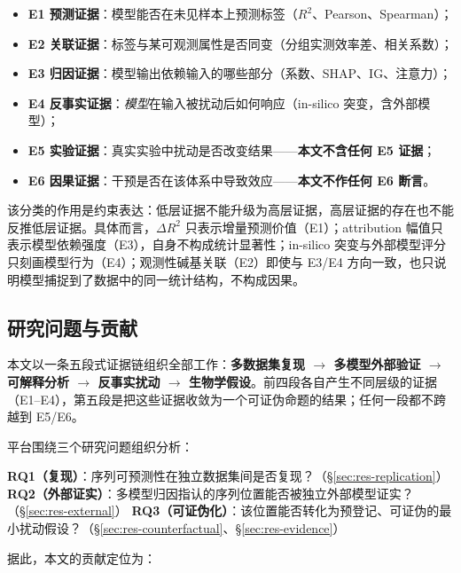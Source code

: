 \begin{itemize}
\item \textbf{E1 预测证据}：模型能否在未见样本上预测标签（$R^{2}$、Pearson、Spearman）；
\item \textbf{E2 关联证据}：标签与某可观测属性是否同变（分组实测效率差、相关系数）；
\item \textbf{E3 归因证据}：模型输出依赖输入的哪些部分（系数、SHAP、IG、注意力）；
\item \textbf{E4 反事实证据}：\emph{模型}在输入被扰动后如何响应（in-silico 突变，含外部模型）；
\item \textbf{E5 实验证据}：真实实验中扰动是否改变结果——\textbf{本文不含任何 E5 证据}；
\item \textbf{E6 因果证据}：干预是否在该体系中导致效应——\textbf{本文不作任何 E6 断言}。
\end{itemize}

该分类的作用是约束表达：低层证据不能升级为高层证据，高层证据的存在也不能反推低层证据。具体而言，$\Delta R^{2}$ 只表示增量预测价值（E1）；attribution 幅值只表示模型依赖强度（E3），自身不构成统计显著性；in-silico 突变与外部模型评分只刻画模型行为（E4）；观测性碱基关联（E2）即使与 E3/E4 方向一致，也只说明模型捕捉到了数据中的同一统计结构，不构成因果。

\subsection{研究问题与贡献}

本文以一条五段式证据链组织全部工作：\textbf{多数据集复现 $\rightarrow$ 多模型外部验证 $\rightarrow$ 可解释分析 $\rightarrow$ 反事实扰动 $\rightarrow$ 生物学假设}。前四段各自产生不同层级的证据（E1--E4），第五段是把这些证据收敛为一个可证伪命题的结果；任何一段都不跨越到 E5/E6。

平台围绕三个研究问题组织分析：

\textbf{RQ1（复现）}：序列可预测性在独立数据集间是否复现？（\S\ref{sec:res-replication}）
\textbf{RQ2（外部证实）}：多模型归因指认的序列位置能否被独立外部模型证实？（\S\ref{sec:res-external}）
\textbf{RQ3（可证伪化）}：该位置能否转化为预登记、可证伪的最小扰动假设？（\S\ref{sec:res-counterfactual}、\S\ref{sec:res-evidence}）

据此，本文的贡献定位为：


